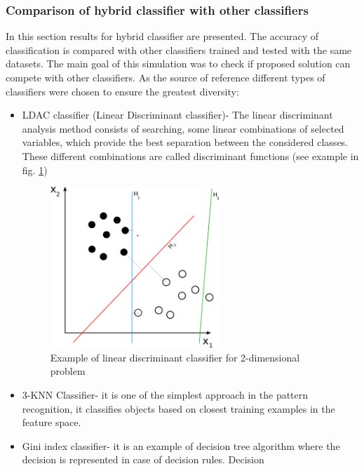 \subsubsection{Comparison of hybrid classifier with other classifiers}
\label{cha:Simulation_reaearch_5}
In this section results for hybrid classifier are presented. The accuracy of
classification is compared with other classifiers trained and tested with the
same datasets. The main goal of this simulation was to check if proposed
solution can compete with other classifiers. As the source of reference
different types of classifiers were chosen to ensure the greatest diversity:
\begin{itemize}
    \item LDAC classifier (Linear Discriminant classifier)- The linear
        discriminant analysis method consists of searching, some linear
        combinations of selected variables, which provide the best separation between the
        considered classes. These different combinations are called
        discriminant functions (see example in fig. \ref{fig:ldac_example})
        \begin{figure}[H]
            \begin{center}
                \includegraphics[width=0.6\textwidth, height=0.5\textwidth]{fig/ldac.png}
            \end{center}
            \caption{Example of linear discriminant classifier for 2-dimensional problem}
            \label{fig:ldac_example}
        \end{figure}
    \item 3-KNN Classifier- it is one of the simplest approach in the pattern
        recognition, it classifies objects based on closest training examples
        in the feature space.
    \item Gini index classifier- it is an example of decision tree algorithm
        where the decision is represented in case of decision rules.  Decision

\end{itemize}
